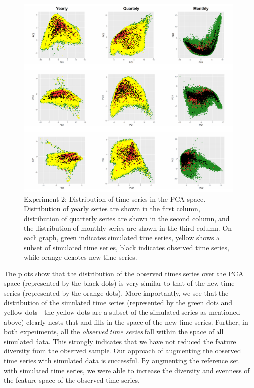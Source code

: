 \documentclass[11pt,a4paper,]{article}
\theoremstyle{definition}
\theoremstyle{definition}
\theoremstyle{definition}
\theoremstyle{remark}
\begin{document}
\begin{figure}

{\centering \includegraphics[width=\textwidth]{figure/exp2pca-1} 

}

\caption{Experiment 2: Distribution of time series in the PCA space. Distribution of yearly series are shown in the first column, distribution of quarterly series are shown in the second column, and the distribution of monthly series are shown in the third column. On each graph, green indicates simulated time series, yellow shows a subset of simulated time series, black indicates observed time series, while orange denotes new time series.}\label{fig:exp2pca}
\end{figure}

The plots show that the distribution of the observed times series over
the PCA space (represented by the black dots) is very similar to that of
the new time series (represented by the orange dots). More importantly,
we see that the distribution of the simulated time series (represented
by the green dots and yellow dots - the yellow dots are a subset of the
simulated series as mentioned above) clearly nests that and fills in the
space of the new time series. Further, in both experiments, all the
\emph{observed time series} fall within the space of all simulated data.
This strongly indicates that we have not reduced the feature diversity
from the observed sample. Our approach of augmenting the observed time
series with simulated data is successful. By augmenting the reference
set with simulated time series, we were able to increase the diversity
and evenness of the feature space of the observed time series.
\end{document}
